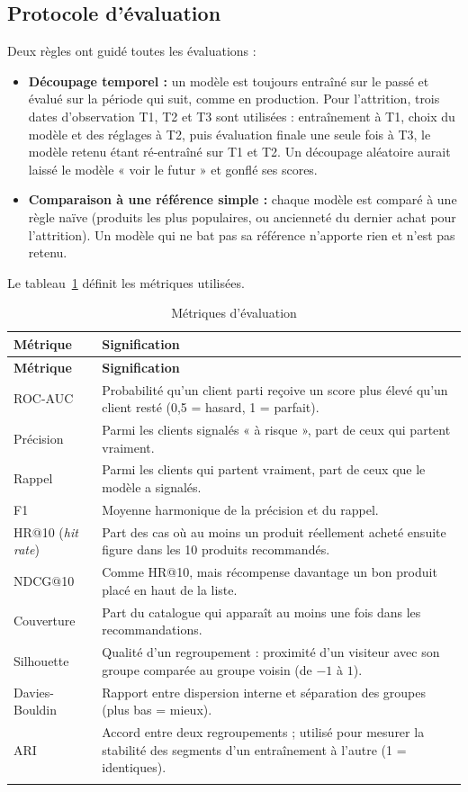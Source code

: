 \subsection{Protocole d'évaluation}
Deux règles ont guidé toutes les évaluations :
\begin{itemize}
  \item \textbf{Découpage temporel :} un modèle est toujours entraîné sur le passé et évalué sur la période qui suit, comme en production. Pour l'attrition, trois dates d'observation T1, T2 et T3 sont utilisées : entraînement à T1, choix du modèle et des réglages à T2, puis évaluation finale une seule fois à T3, le modèle retenu étant ré-entraîné sur T1 et T2. Un découpage aléatoire aurait laissé le modèle « voir le futur » et gonflé ses scores.
  \item \textbf{Comparaison à une référence simple :} chaque modèle est comparé à une règle naïve (produits les plus populaires, ou ancienneté du dernier achat pour l'attrition). Un modèle qui ne bat pas sa référence n'apporte rien et n'est pas retenu.
\end{itemize}

Le tableau~\ref{tab:metriques} définit les métriques utilisées.
\renewcommand{\arraystretch}{1.3}
\begin{longtable}{|p{3.2cm}|p{11.4cm}|}
\hline
\textbf{Métrique} & \textbf{Signification} \\
\hline
\endfirsthead
\hline
\textbf{Métrique} & \textbf{Signification} \\
\hline
\endhead
ROC-AUC & Probabilité qu'un client parti reçoive un score plus élevé qu'un client resté (0,5 = hasard, 1 = parfait). \\
\hline
Précision & Parmi les clients signalés « à risque », part de ceux qui partent vraiment. \\
\hline
Rappel & Parmi les clients qui partent vraiment, part de ceux que le modèle a signalés. \\
\hline
F1 & Moyenne harmonique de la précision et du rappel. \\
\hline
HR@10 (\textit{hit rate}) & Part des cas où au moins un produit réellement acheté ensuite figure dans les 10 produits recommandés. \\
\hline
NDCG@10 & Comme HR@10, mais récompense davantage un bon produit placé en haut de la liste. \\
\hline
Couverture & Part du catalogue qui apparaît au moins une fois dans les recommandations. \\
\hline
Silhouette & Qualité d'un regroupement : proximité d'un visiteur avec son groupe comparée au groupe voisin (de $-1$ à $1$). \\
\hline
Davies-Bouldin & Rapport entre dispersion interne et séparation des groupes (plus bas = mieux). \\
\hline
ARI & Accord entre deux regroupements ; utilisé pour mesurer la stabilité des segments d'un entraînement à l'autre (1 = identiques). \\
\hline
\caption{Métriques d'évaluation}
\label{tab:metriques}
\end{longtable}


